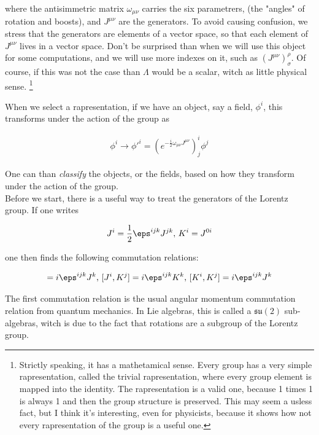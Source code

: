 \documentclass{report}
\begin{document}
where the antisimmetric matrix \(\omega_{\mu\nu}\) carries the six parametrers, (the "angles" of rotation and boosts), and \(J^{\mu\nu}\) are the generators. To avoid causing confusion, we stress that the generators are elements of a vector space, so that each element of \(J^{\mu\nu}\) lives in a vector space. Don't be surprised than when we will use this object for some computations, and we will use more indexes on it, such as \((J^{\mu\nu})^{\rho}_\sigma\). Of course, if this was not the case than \(\Lambda\) would be a scalar, witch as little physical sense. \footnote{Strictly speaking, it has a mathetamical sense. Every group has a very simple rapresentation, called the trivial rapresentation, where every group element is mapped into the identity. The rapresentation is a valid one, because 1 times 1 is always 1 and then the group structure is preserved. This may seem a usless fact, but I think it's interesting, even for physicists, because it shows how not every rapresentation of the group is a useful one. }

When we select a rapresentation, if we have an object, say a field, \(\phi^i\), this transforms under the action of the group as 

\begin{align}
    \phi^i \rightarrow \phi'^i = \left(e^{-\frac{i}{2}\omega_{\mu\nu}J^{\mu\nu}}\right)^i_j \phi^ j 
\end{align}

One can than \emph{classify} the objects, or the fields, based on how they transform under the action of the group. \\

Before we start, there is a useful way to treat the generators of the Lorentz group. If one writes 

\begin{align}
    J^i = \frac{1}{2}\eps^{ijk}J^{jk}, \, K^i = J^{0i}
\end{align}

one then finds the following commutation relations: 

\begin{align}
    [J^i, J^j] = i\eps^{ijk}J^k, \, [J^i, K^j] = i\eps^{ijk}K^k, \, [K^i, K^j] = i\eps^{ijk}J^k
\end{align}

The first commutation relation is the usual angular momentum commutation relation from quantum mechanics. In Lie algebras, this is called a \(\mathfrak{su}(2)\) sub-algebras, witch is due to the fact that rotations are a subgroup of the Lorentz group. 
\end{document}
